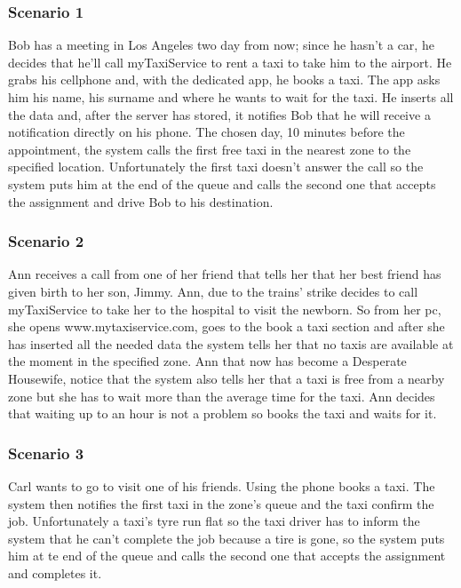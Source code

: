 		\subsubsection{Scenario 1}
		Bob has a meeting in Los Angeles two day from now; since he hasn't a car, he decides that he'll call myTaxiService to rent a taxi to take him to the airport. He grabs his cellphone and, with the dedicated app, he books a taxi. The app asks him his name, his surname and where he wants to wait for the taxi. He inserts all the data and, after the server has stored, it notifies Bob that he will receive a notification directly on his phone. The chosen day, 10 minutes before the appointment, the system calls the first free taxi in the nearest zone to the specified location. Unfortunately the first taxi doesn't answer the call so the system puts him at the end of the queue and calls the second one that accepts the assignment and drive Bob to his destination.
		
		\subsubsection{Scenario 2}
		Ann receives a call from one of her friend that tells her that her best friend has given birth to her son, Jimmy. Ann, due to the trains' strike decides to call myTaxiService to take her to the hospital to visit the newborn. So from her pc, she opens www.mytaxiservice.com, goes to the book a taxi section and after she has inserted all the needed data the system tells her that no taxis are available at the moment in the specified zone. Ann that now has become a Desperate Housewife, notice that the system also tells her that a taxi is free from a nearby zone but she has to wait more than the average time for the taxi. Ann decides that waiting up to an hour is not a problem so books the taxi and waits for it. 
		
		\subsubsection{Scenario 3}
		Carl wants to go to visit one of his friends. Using the phone books a taxi. The system then notifies the first taxi in the zone's queue and the taxi confirm the job. Unfortunately a taxi's tyre run flat so the taxi driver has to inform the system that he can't complete the job because a tire is gone, so the system puts him at te end of the queue and calls the second one that accepts the assignment and completes it.
		
